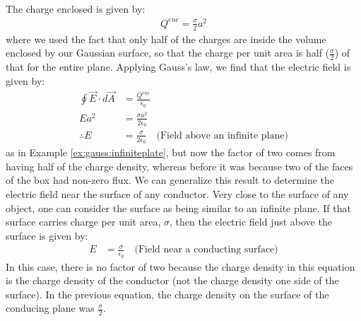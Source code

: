 The charge enclosed is given by:
\begin{align*}
Q^{enc}=\frac{\sigma}{2}a^2
\end{align*}
where we used the fact that only half of the charges are inside the volume enclosed by our Gaussian surface, so that the charge per unit area is half ($\frac{\sigma}{2}$) of that for the entire plane. Applying Gauss's law, we find that the electric field is given by:
\begin{align*}
\oint \vec E\cdot d\vec A&=\frac{Q^{enc}}{\epsilon_0} \\
Ea^2&= \frac{\sigma a^2}{2\epsilon_0}\\
\therefore E&= \frac{\sigma}{2\epsilon_0}\quad \text{(Field above an infinite plane)}
\end{align*}
as in Example \ref{ex:gauss:infiniteplate}, but now the factor of two comes from having half of the charge density, whereas before it was because two of the faces of the box had non-zero flux. We can generalize this result to determine the electric field near the surface of any conductor. Very close to the surface of any object, one can consider the surface as being similar to an infinite plane. If that surface carries charge per unit area, $\sigma$, then the electric field just above the surface is given by:
\begin{align*}
 E&= \frac{\sigma}{\epsilon_0} \quad \text{(Field near a conducting surface)}
\end{align*}
In this case, there is no factor of two because the charge density in this equation is the charge density of the conductor (not the charge density one side of the surface). In the previous equation, the charge density on the surface of the conducing plane was $\frac{\sigma}{2}$.

